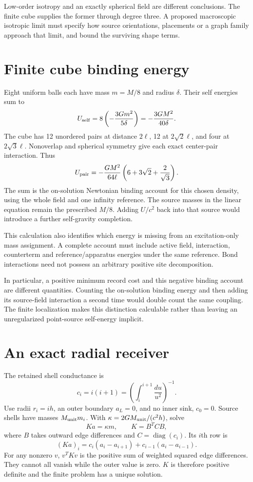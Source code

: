 \documentclass[10pt,twocolumn,letterpaper]{article}
\begin{document}
Low-order isotropy and an exactly spherical field are different conclusions. The finite cube supplies the former through degree three. A proposed macroscopic isotropic limit must specify how source orientations, placements or a graph family approach that limit, and bound the surviving shape terms.

\section{Finite cube binding energy}
Eight uniform balls each have mass $m=M/8$ and radius $\delta$. Their self energies sum to
\[
U_{\rm self}=8\left(-\frac{3Gm^2}{5\delta}\right)=-\frac{3GM^2}{40\delta}.
\]
The cube has 12 unordered pairs at distance $2\ell$, 12 at $2\sqrt2\ell$, and four at $2\sqrt3\ell$. Nonoverlap and spherical symmetry give each exact center-pair interaction. Thus
\[
U_{\rm pair}=-\frac{GM^2}{64\ell}\left(6+3\sqrt2+\frac2{\sqrt3}\right).
\]
The sum is the on-solution Newtonian binding account for this chosen density, using the whole field and one infinity reference. The source masses in the linear equation remain the prescribed $M/8$. Adding $U/c^2$ back into that source would introduce a further self-gravity completion.

This calculation also identifies which energy is missing from an excitation-only mass assignment. A complete account must include active field, interaction, counterterm and reference/apparatus energies under the same reference. Bond interactions need not possess an arbitrary positive site decomposition.

In particular, a positive minimum record cost and this negative binding account are different quantities. Counting the on-solution binding energy and then adding its source-field interaction a second time would double count the same coupling. The finite localization makes this distinction calculable rather than leaving an unregularized point-source self-energy implicit.

\section{An exact radial receiver}
The retained shell conductance is
\[
c_i=i(i+1)=\left(\int_i^{i+1}\frac{du}{u^2}\right)^{-1}.
\]
Use radii $r_i=ih$, an outer boundary $a_L=0$, and no inner sink, $c_0=0$. Source shells have masses $M_{\rm unit}m_i$. With $\kappa=2GM_{\rm unit}/(c^2h)$, solve
\[
Ka=\kappa m,\qquad K=B^TCB,
\]
where $B$ takes outward edge differences and $C=\operatorname{diag}(c_i)$. Its $i$th row is
\[
(Ka)_i=c_i(a_i-a_{i+1})+c_{i-1}(a_i-a_{i-1}).
\]
For any nonzero $v$, $v^TKv$ is the positive sum of weighted squared edge differences. They cannot all vanish while the outer value is zero. $K$ is therefore positive definite and the finite problem has a unique solution.
\end{document}
